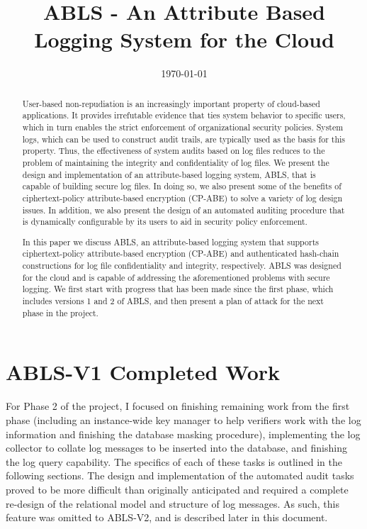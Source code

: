 \documentclass{sig-alternate}
\begin{document}
\title{ABLS - An Attribute Based Logging System for the Cloud}
\author{
}
\date{\today}
\maketitle
\begin{abstract}
User-based non-repudiation is an increasingly important property of cloud-based applications. It provides irrefutable evidence that ties system behavior to specific users, which in turn enables the strict enforcement of organizational security policies. System logs, which can be used to construct audit trails, are typically used as the basis for this property. Thus, the effectiveness of system audits based on log files reduces to the problem of maintaining the integrity and confidentiality of log files. We present the design and implementation of an attribute-based logging system, ABLS, that is capable of building secure log files. In doing so, we also present some of the benefits of ciphertext-policy attribute-based encryption (CP-ABE) to solve a variety of log design issues. In addition, we also present the design of an automated auditing procedure
that is dynamically configurable by its users to aid in security policy enforcement.

In this paper we discuss ABLS, an attribute-based logging system that supports ciphertext-policy 
attribute-based encryption (CP-ABE) \cite{Bethencourt2007-CPABE} and authenticated hash-chain 
constructions for log file confidentiality and integrity, respectively. ABLS was designed for
the cloud and is capable of addressing the aforementioned problems with secure logging. 
We first start with progress that has been made since the first phase, which includes versions
1 and 2 of ABLS, and then present a plan of attack for the next phase in the project. 
\end{abstract}

\section{ABLS-V1 Completed Work}

For Phase 2 of the project, I focused on finishing remaining work from the first phase (including an instance-wide
key manager to help verifiers work with the log information and finishing the database masking procedure), implementing the log collector to collate log messages to be inserted into the database, and finishing the log query capability. 
The specifics of each of these tasks is outlined in the following sections. The design and implementation of 
the automated audit tasks proved to be more difficult than originally anticipated and required a complete re-design of 
the relational model and structure of log messages. As such, this feature was omitted to ABLS-V2, and is described 
later in this document.
\end{document}
